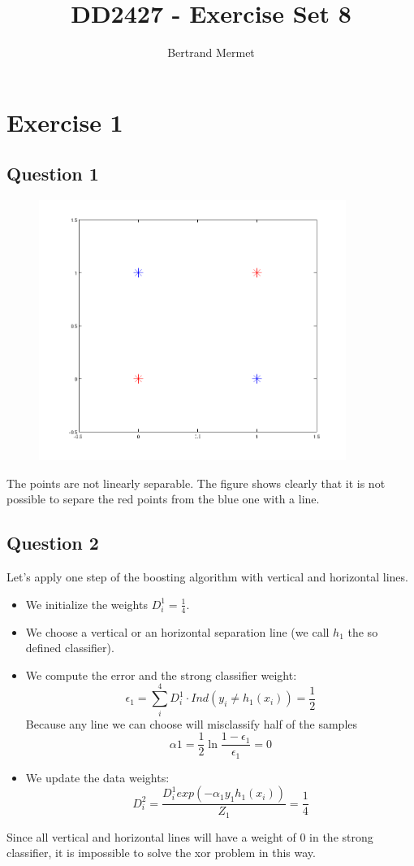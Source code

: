 \documentclass[a4paper,11pt]{article}
\title{\textbf{DD2427 - Exercise Set 8\bigskip}}
\author{Bertrand Mermet}
\date{}
\theoremstyle{nonumberplain}
\begin{document}
\maketitle

\section{Exercise 1}
\subsection{Question 1}
\begin{figure}[H]
\includegraphics[width=100mm]{xor.png}
\end{figure}
The points are not linearly separable. The figure shows clearly that it is not possible to separe the red points from the blue one with a line.
\subsection{Question 2}
Let's apply one step of the boosting algorithm with vertical and horizontal lines.
\begin{itemize}
    \item We initialize the weights $D_i^1 = \frac{1}{4}$.
    \item We choose a vertical or an horizontal separation line (we call $h_1$ the so defined classifier).
    \item We compute the error and the strong classifier weight:
        \[
            \epsilon_1 = \sum^4_i{D_i^1 \cdot Ind(y_i \not= h_1(x_i))} = \frac{1}{2} 
        \]
        Because any line we can choose will misclassify half of the samples
        \[
            \alpha{1} = \frac{1}{2}\ln{\frac{1 - \epsilon_1}{\epsilon_1}} = 0
        \]
    \item We update the data weights:
        \[
        D_i^2 = \frac{D_i^1 exp(-\alpha_1y_1h_1(x_i))}{Z_1} = \frac{1}{4} 
    \]
\end{itemize}
Since all vertical and horizontal lines will have a weight of 0 in the strong classifier, it is impossible to solve the xor problem in this way.
\end{document}
